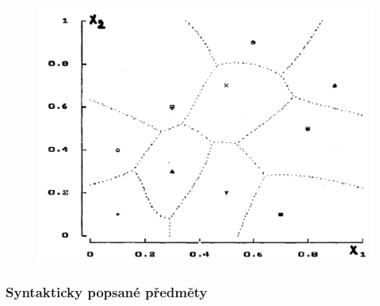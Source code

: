 \begin{figure}[H]
    \includegraphics[scale = 0.2]{images/priznakove.png}
\end{figure}

\subsubsection{Syntakticky popsané předměty}

